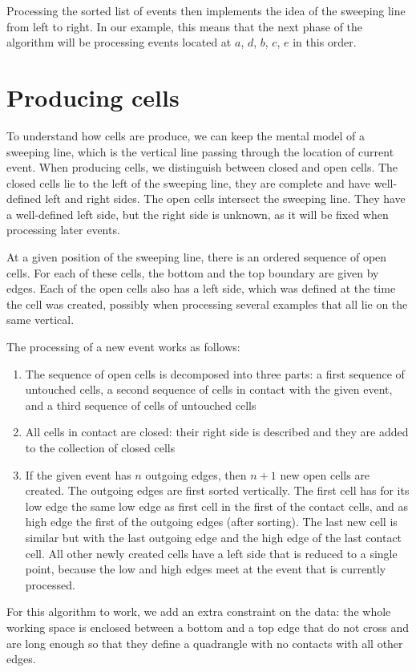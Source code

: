 \documentclass{easychair}
\begin{document}
Processing the sorted list of events then implements the idea of the
sweeping line from left to right.  In our example, this means that the
next phase of the algorithm will be processing events located at
\(a\), \(d\), \(b\), \(c\), \(e\) in this order.

\section{Producing cells}
To understand how cells are produce, we can keep the mental model of a
sweeping line, which is the vertical line passing through the location of
current event.
When producing cells, we distinguish between closed and open cells.
The closed cells lie to the left of the sweeping line, they are
complete and have well-defined left and right sides.  The open cells
intersect the sweeping line.  They have a well-defined left side,
but the right side is unknown, as it will be fixed when
processing later events.

At a given position of the sweeping line, there is an ordered sequence
of open cells.  For each of these cells, the bottom and the top
boundary are given by edges.  Each of the open cells also has a
left side, which was defined at the time the cell was created,
possibly when processing several examples that all lie on the same
vertical.

The processing of a new event works as follows:
\begin{enumerate}
\item The sequence of open cells is decomposed into three parts:
a first sequence of untouched cells, a second sequence of cells in
contact with the given event, and a third sequence of cells of
untouched cells
\item All cells in contact are closed: their right side is
  described and they are added to the collection of closed cells
\item If the given event has \(n\) outgoing edges, then \(n+1\) new
  open cells are created.  The outgoing edges are first sorted vertically.
  The first cell has for its low edge the
  same low edge as first cell in the first of the contact cells, and
  as high edge the first of the outgoing edges (after sorting).  The
  last new cell is similar but with the last outgoing edge and the
  high edge of the last contact cell.  All other newly created cells have a
  left side that is reduced to a single point, because the low and
  high edges meet at the event that is currently processed.
\end{enumerate}
For this algorithm to work, we add an extra constraint on the data:
the whole working space is enclosed between a bottom and a top edge that
do not cross and
 are long enough so that they define a quadrangle with no contacts
with all other edges.
\end{document}
